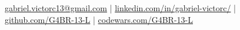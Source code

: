 
\begin{center}

  {\Large{}} \href{mailto:gabriel.victorc13@gmail.com}{gabriel.victorc13@gmail.com} |
  {\Large{}} \href{https://linkedin.com/in/gabriel-victorc/}{linkedin.com/in/gabriel-victorc/} | \\
  {\Large{}} \href{https://github.com/G4BR-13-L}{github.com/G4BR-13-L} |
  {\Large{}} \href{https://www.codewars.com/users/G4BR-%3E13-L}{codewars.com/G4BR-13-L}
\end{center}